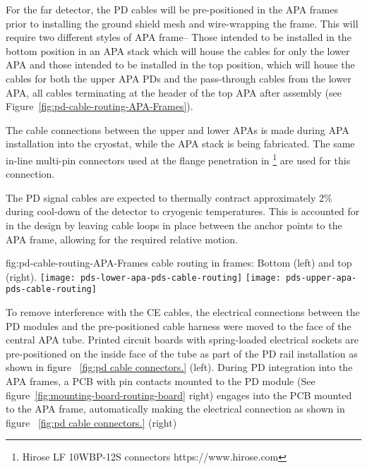 For the far detector, the PD cables will be pre-positioned in the APA frames prior to installing the ground shield mesh and wire-wrapping the frame.  This will require two different styles of APA frame--  Those intended to be installed in the bottom position in an APA stack which will house the cables for only the lower APA and those intended to be installed in the top position, which will house the cables for both the upper APA PDs and the pass-through cables from the lower APA, all cables terminating at the header of the top APA after assembly (see Figure~\ref{fig:pd-cable-routing-APA-Frames}).

The cable connections between the upper and lower APAs is made during APA installation into the cryostat, while the APA stack is being fabricated.  The same in-line multi-pin connectors used at the flange penetration in \footnote{Hirose LF 10WBP-12S connectors https://www.hirose.com} are used for this connection.

The PD signal cables are expected to thermally contract approximately 2\% during cool-down of the detector to cryogenic temperatures.  This is accounted for in the design by leaving cable loops in place between the anchor points to the APA frame, allowing for the required relative motion.


\begin{dunefigure}
{fig:pd-cable-routing-APA-Frames}
{ cable routing in  frames: Bottom  (left) and top  (right).}
	\texttt{[image: pds-lower-apa-pds-cable-routing]}
	\texttt{[image: pds-upper-apa-pds-cable-routing]}
	\vspace{-1.5cm}
\end{dunefigure}

To remove interference with the CE cables, the electrical connections between the PD modules and the pre-positioned cable harness were moved to the face of the central APA tube.  Printed circuit boards with spring-loaded electrical sockets are pre-positioned on the inside face of the tube as part of the PD rail installation as shown in figure ~\ref{fig:pd cable connectors.} (left).  During PD integration into the APA frames, a PCB with pin contacts mounted to the PD module (See figure~\ref{fig:mounting-board-routing-board} right) engages into the PCB mounted to the APA frame, automatically making the electrical connection as shown in figure ~\ref{fig:pd cable connectors.} (right)

